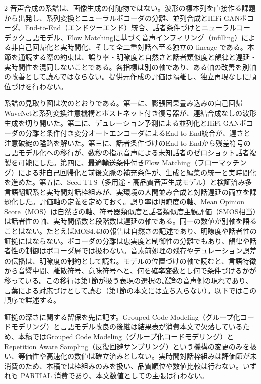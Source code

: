 \documentclass[lualatex,a4paper,10pt]{jlreq}
\begin{document}
\begin{multicols}{2}
\raggedcolumns
音声合成の系譜は、画像生成の付随物ではない。波形の標本列を直接作る課題から出発し、系列変換とニューラルボコーダの分離、並列合成とHiFi-GANボコーダ、End-to-End（エンドツーエンド）統合、話者条件づけとニューラルコーデック言語モデル、Flow Matchingに基づく音声インフィリング（infilling）による非自己回帰化と実時間化、そして全二重対話へ至る独立の lineage である\autocite{btd051,btd052,btd053}。本節を通読する際の約束は、誤り率・明瞭度と自然さと話者類似度と韻律と遅延・実時間性を混同しないことである。各指標は別の軸であり、ある軸の改善を別軸の改善として読んではならない\autocite{btd051,btd057,btd058}。提供元作成の評価は隔離し、独立再現なしに順位づけを行わない\autocite{btd061,btd062}。

系譜の見取り図は次のとおりである。第一に、膨張因果畳み込みの自己回帰WaveNetと系列変換注意機構とポストネット付き復号器が、連結合成なしの波形生成を切り開いた\autocite{btd051,btd052,btd053}。第二に、デュレーション予測による並列化とHiFi-GANボコーダの分離と条件付き変分オートエンコーダによるEnd-to-End統合が、遅さと注意破綻の隘路を解いた\autocite{btd054,btd055,btd056}。第三に、話者条件づけのEnd-to-Endから残差符号の言語モデル化への移行が、数秒の指示音声による未知話者のゼロショット話者複製を可能にした\autocite{btd057,btd058}。第四に、最適輸送条件付きFlow Matching（フローマッチング）による非自己回帰化と前後文脈の補充条件が、生成と編集の統一と実時間化を進めた\autocite{btd060,btd132,btd133}。第五に、Seed-TTS（多用途・高品質音声生成モデル）と検証済み多言語翻訳系と実時間対話枠組みが、実環境の人間並み合成と対話遅延の両立を課題化した\autocite{btd061,btd062,btd134}。評価軸の定義を定めておく。誤り率は明瞭度の軸、Mean Opinion Score（MOS）は自然さの軸、符号器類似度と話者類似度主観評価（SMOS相当）は話者性の軸、実時間係数と段階数は遅延の軸である\autocite{btd051,btd054,btd057,btd058,btd132,btd133}。同一の数値が別軸を語ることはない。たとえばMOS$4.43$の報告は自然さの記述であり、明瞭度や話者性の証拠にはならない\autocite{btd056}。ボコーダの分離は忠実度と制御性の分離でもあり、韻律や話者性の制御はボコーダ層では扱わない\autocite{btd055}。音素前処理の残存やデュレーション誤差の伝播は、明瞭度の制約として読む\autocite{btd054,btd056}。モデルの位置づけの軸で読むと、言語特徴から音響中間、離散符号、意味符号へと、何を確率変数とし何で条件づけるかが移っている\autocite{btd051,btd054,btd058,btd133}。この移行は第1節が扱う表現の選択の議論の音声側の現れであり、言葉による対応づけとして読む（第1節の本文には立ち入らない）。以下ではこの順序で詳述する。

証拠の深さに関する留保を先に記す。Grouped Code Modeling（グループ化コードモデリング）と言語モデル改良の後継は結果表が消費本文で欠落しているため、本稿ではGrouped Code Modeling（グループ化コードモデリング）とRepetition Aware Sampling（反復回避サンプリング）という機構の変更のみを扱い、等価性や高速化の数値は確立済みとしない\autocite{btd059}。実時間対話枠組みは評価節が未消費のため、本稿では枠組みのみを扱い、品質順位や数値比較は行わない\autocite{btd134}。いずれも PARTIAL 消費であり、本文数値としての主張は行わない\autocite{btd059,btd134}。
\end{multicols}
\end{document}
